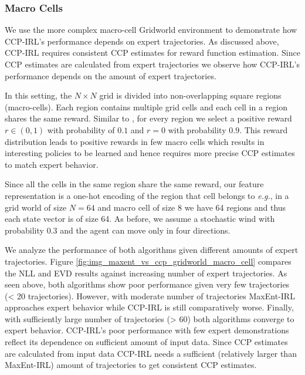 \documentclass{article}
\begin{document}
\subsubsection{Macro Cells}

We use the more complex macro-cell Gridworld environment \cite{abbeel2004apprenticeship} to demonstrate how CCP-IRL's performance depends on expert trajectories.
As discussed above, CCP-IRL requires consistent CCP estimates for reward function estimation. Since CCP estimates are calculated from expert trajectories we observe how CCP-IRL's performance depends on the amount of expert trajectories.

In this setting, the $N \times N$ grid is divided into non-overlapping square regions (macro-cells). Each region contains multiple grid cells and each cell in a region shares the same reward. Similar to \cite{abbeel2004apprenticeship}, for every region we select a positive reward $r \in (0, 1)$ with probability of $0.1$ and $r = 0$ with probability $0.9$. This reward distribution leads to positive rewards in few macro cells which results in interesting policies to be learned and hence requires more precise CCP estimates to match expert behavior.

Since all the cells in the same region share the same reward, our feature representation is a one-hot encoding of the region that cell belongs to \emph{e.g.}, in a grid world of size $N=64$ and macro cell of size 8 we have 64 regions and thus each state vector is of size 64. As before, we assume a stochastic wind with probability $0.3$ and the agent can move only in four directions. 

We analyze the performance of both algorithms given different amounts of expert trajectories.
Figure \ref{fig:img_maxent_vs_ccp_gridworld_macro_cell} compares the NLL and EVD results against increasing number of expert trajectories.
As seen above, both algorithms show poor performance given very few trajectories (< 20 trajectories).
However, with moderate number of trajectories MaxEnt-IRL approaches expert behavior while CCP-IRL is still comparatively worse.
Finally, with sufficiently large number of trajectories (> 60) both algorithms converge to expert behavior. 
CCP-IRL's poor performance with few expert demonstrations reflect its dependence on sufficient amount of input data.
Since CCP estimates are calculated from input data CCP-IRL needs a sufficient (relatively larger than MaxEnt-IRL) amount of trajectories to get consistent CCP estimates.
\end{document}
